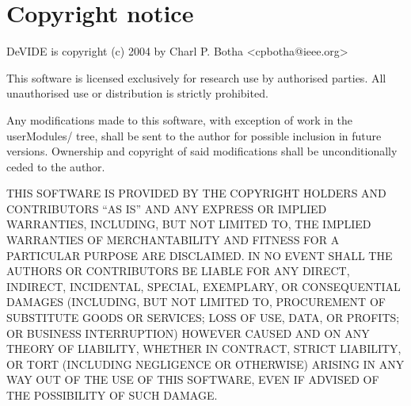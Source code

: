 %
%
\newcommand{\commandref}[2]{\helpref{{\tt $\backslash$#1}}{#2}}%
\newcommand{\commandrefn}[2]{\helprefn{{\tt $\backslash$#1}}{#2}\index{#1}}%
\newcommand{\commandpageref}[2]{\latexignore{\helprefn{{\tt $\backslash$#1}}{#2}}\latexonly{{\tt $\backslash$#1} {\it page \pageref{#2}}}\index{#1}}%
\newcommand{\indexit}[1]{#1\index{#1}}%
\newcommand{\inioption}[1]{{\bf {\tt #1}}\index{#1}}%
\parskip=10pt%
\parindent=0pt%
%
%
\makeindex%
%
\maketitle%
\pagestyle{fancyplain}%
%
%
%
\setfooter{\thepage}{}{}{}{}{\thepage}%
\tableofcontents%

\chapter*{Copyright notice}%
%
\setfooter{\thepage}{}{}{}{}{\thepage}%
DeVIDE is copyright (c) 2004 by Charl P. Botha <cpbotha@ieee.org>

This software is licensed exclusively for research use by authorised
parties.  All unauthorised use or distribution is strictly prohibited.

Any modifications made to this software, with exception of work in the
userModules/ tree, shall be sent to the author for possible inclusion
in future versions.  Ownership and copyright of said modifications
shall be unconditionally ceded to the author.

THIS SOFTWARE IS PROVIDED BY THE COPYRIGHT HOLDERS AND CONTRIBUTORS
``AS IS'' AND ANY EXPRESS OR IMPLIED WARRANTIES, INCLUDING, BUT NOT
LIMITED TO, THE IMPLIED WARRANTIES OF MERCHANTABILITY AND FITNESS FOR
A PARTICULAR PURPOSE ARE DISCLAIMED.  IN NO EVENT SHALL THE AUTHORS OR
CONTRIBUTORS BE LIABLE FOR ANY DIRECT, INDIRECT, INCIDENTAL, SPECIAL,
EXEMPLARY, OR CONSEQUENTIAL DAMAGES (INCLUDING, BUT NOT LIMITED TO,
PROCUREMENT OF SUBSTITUTE GOODS OR SERVICES; LOSS OF USE, DATA, OR
PROFITS; OR BUSINESS INTERRUPTION) HOWEVER CAUSED AND ON ANY THEORY OF
LIABILITY, WHETHER IN CONTRACT, STRICT LIABILITY, OR TORT (INCLUDING
NEGLIGENCE OR OTHERWISE) ARISING IN ANY WAY OUT OF THE USE OF THIS
SOFTWARE, EVEN IF ADVISED OF THE POSSIBILITY OF SUCH DAMAGE.

